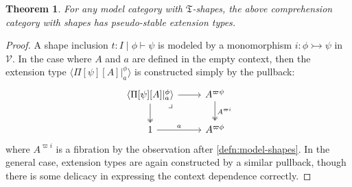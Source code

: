 \documentclass[12pt]{amsart}
\theoremstyle{plain}
\newtheorem{thm}{Theorem}[section]
\theoremstyle{definition}
\theoremstyle{remark}
\numberwithin{equation}{section}
\newcommand{\ccexten}[4]{\langle\Pi[#1][#2] |^{#3}_{#4}\rangle}
\newcommand{\types}{\vdash}
\newcommand{\V}{\mathcal{V}}
\newcommand{\fT}{\mathfrak{T}}
\begin{document}
\begin{thm}
  For any model category with $\fT$-shapes, the above comprehension category with shapes has pseudo-stable extension types.
\end{thm}
\begin{proof}
A shape inclusion $t:I \mid \phi \types \psi$ is modeled by a monomorphism $i \colon \phi \rightarrowtail \psi$ in $\V$. In the case where $A$ and $a$ are defined in the empty context, then the extension type $\ccexten{\psi}{A}{\phi}{a}$ is constructed simply by the pullback:
 \[
 \begin{tikzcd} {\ccexten{\psi}{A}{\phi}{a}} \arrow[r] \arrow[d, two heads] \arrow[dr, phantom, "\lrcorner" very near start] & A^{\varpi\psi} \arrow[d, two heads, "A^{\varpi i}"] \\ 1 \arrow[r, "a"] & A^{\varpi\phi}
 \end{tikzcd}
 \]
where $A^{\varpi i}$ is a fibration by the observation after \cref{defn:model-shapes}.
In the general case, extension types are again constructed by a similar pullback, though there is some delicacy in expressing the context dependence correctly.


\end{proof}
\end{document}
